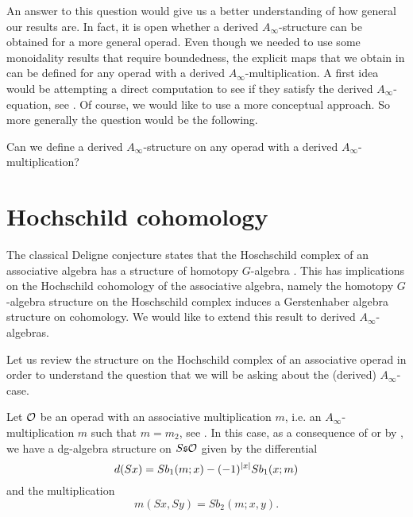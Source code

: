 \documentclass[Thesis.tex]{subfiles}
\begin{document}
An answer to this question would give us a better understanding of how general our results are. In fact, it is open whether a derived $A_\infty$-structure can be obtained for a more general operad. Even though we needed to use some monoidality results that require boundedness, the explicit maps that we obtain in  can be defined for any operad with a derived $A_\infty$-multiplication. A first idea would be attempting a direct computation to see if they satisfy the derived $A_\infty$-equation, see . Of course, we would like to use a more conceptual approach. So more generally the question would be the following.

\begin{question}{2}
Can we define a derived $A_\infty$-structure on any operad with a derived $A_\infty$-multiplication?
\end{question}

\section{Hochschild cohomology}


 

The classical Deligne conjecture states that the Hoschschild complex of an associative algebra has a structure of homotopy $G$-algebra \cite{GV}. This has implications on the Hochschild cohomology of the associative algebra, namely the homotopy $G$-algebra structure on the Hoschschild complex induces a Gerstenhaber algebra structure on cohomology. We would like to extend this result to derived $A_\infty$-algebras.

Let us review the structure on the Hochschild complex of an associative operad in order to understand the question that we will be asking about the (derived) $A_\infty$-case.

Let ${\mathcal O}$ be an operad with an associative multiplication $m$, i.e. an $A_\infty$-multiplication $m$ such that $m=m_2$, see . In this case, as a consequence of  or by \cite[Proposition 2]{GV}, we have a dg-algebra structure on $S\mathfrak{s}{\mathcal O}$ given by the differential
\begin{equation}\label{differential}
d(Sx) =  Sb_1(m; x) -(-1)^{|x|}Sb_1(x; m)\\
\end{equation}
and the multiplication
\begin{equation}\label{multiplication}
m(Sx,Sy) = Sb_2(m;x,y).
\end{equation}
\end{document}

